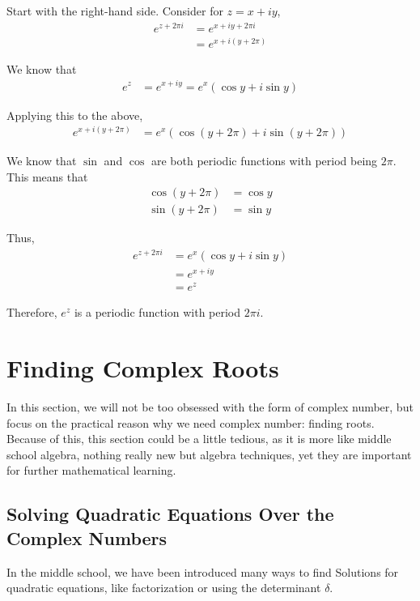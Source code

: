 Start with the right-hand side. Consider for \( z = x + iy \),
\begin{align*}
e^{z+2\pi i} &= e^{x+iy+2\pi i} \\
&= e^{x+i(y+2\pi)}
\end{align*}

We know that
\begin{align*}
e^z &= e^{x+iy} = e^x(\cos y + i \sin y)
\end{align*}

Applying this to the above,
\begin{align*}
e^{x+i(y+2\pi)} &= e^x(\cos(y + 2\pi) + i \sin(y + 2\pi))
\end{align*}

We know that \(\sin\) and \(\cos\) are both periodic functions with period being \(2\pi\). This means that
\begin{align*}
\cos(y + 2\pi) &= \cos y \\
\sin(y + 2\pi) &= \sin y
\end{align*}

Thus,
\begin{align*}
e^{z+2\pi i} &= e^x(\cos y + i \sin y) \\
&= e^{x+iy} \\
&= e^z
\end{align*}

Therefore, \( e^z \) is a periodic function with period \( 2\pi i \).

\section{Finding Complex Roots}
In this section, we will not be too obsessed with the form of complex number, but focus on the practical reason
why we need complex number: finding roots. Because of this, this section could be a little tedious, as it is more
like middle school algebra, nothing really new but algebra techniques, yet they are important for further mathematical learning. 
\subsection{Solving Quadratic Equations Over the Complex Numbers}
In the middle school, we have been introduced many ways to find Solutions for quadratic equations, like factorization or using
the determinant $\delta$.


